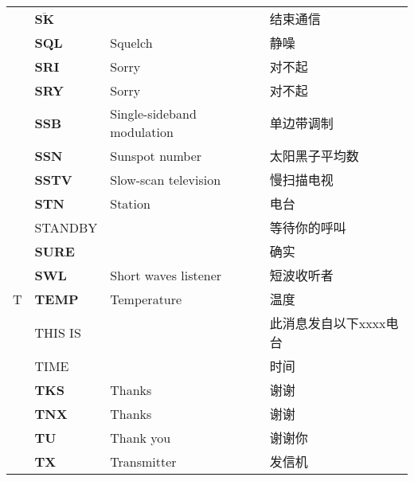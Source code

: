 \begin{longtable}[l]{llll}
    & $\overline{\mathbf{S}\mathbf{K}}$ &                                         & 结束通信                \\
    & \textbf{SQL}                      & Squelch                                 & 静噪                  \\
    & \textbf{SRI}                      & Sorry                                   & 对不起                 \\
    & \textbf{SRY}                      & Sorry                                   & 对不起                 \\
    & \textbf{SSB}                      & Single-sideband modulation              & 单边带调制               \\
    & \textbf{SSN}                      & Sunspot number                          & 太阳黑子平均数             \\
    & \textbf{SSTV}                     & Slow-scan television                    & 慢扫描电视               \\
    & \textbf{STN}                      & Station                                 & 电台                  \\
    & STANDBY                           &                                         & 等待你的呼叫              \\
    & \textbf{SURE}                     &                                         & 确实                  \\
    & \textbf{SWL}                      & Short waves listener                    & 短波收听者               \\
  T & \textbf{TEMP}                     & Temperature                             & 温度                  \\
    & THIS IS                           &                                         & 此消息发自以下xxxx电台       \\
    & TIME                              &                                         & 时间                  \\
    & \textbf{TKS}                      & Thanks                                  & 谢谢                  \\
    & \textbf{TNX}                      & Thanks                                  & 谢谢                  \\
    & \textbf{TU}                       & Thank you                               & 谢谢你                 \\
    & \textbf{TX}                       & Transmitter                             & 发信机                 \\

\end{longtable}

